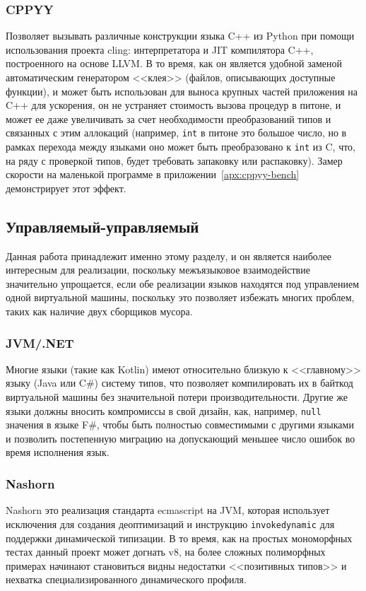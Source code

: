 \documentclass[times
,titlepage
]{itmo-student-thesis}
\begin{document}
\subsubsection{CPPYY}
Позволяет вызывать различные конструкции языка C++ из Python при помощи использования проекта cling: интерпретатора и JIT компилятора C++, построенного на основе LLVM. В то время, как он является удобной заменой автоматическим генератором <<клея>> (файлов, описывающих доступные функции), и может быть использован для выноса крупных частей приложения на C++ для ускорения, он не устраняет стоимость вызова процедур в питоне, и может ее даже увеличивать за счет необходимости преобразований типов и связанных с этим аллокаций (например, \texttt{int} в питоне это большое число, но в рамках перехода между языками оно может быть преобразовано к \texttt{int} из C, что, на ряду с проверкой типов, будет требовать запаковку или распаковку). Замер скорости на маленькой программе в приложении~\ref{apx:cppyy-bench} демонстрирует этот эффект.

\subsection{Управляемый-управляемый}
Данная работа принадлежит именно этому разделу, и он является наиболее интересным для реализации, поскольку межъязыковое взаимодействие значительно упрощается, если обе реализации языков находятся под управлением одной виртуальной машины, поскольку это позволяет избежать многих проблем, таких как наличие двух сборщиков мусора.
\subsubsection{JVM/.NET}
Многие языки (такие как Kotlin) имеют относительно близкую к <<главному>> языку (Java или C\#) систему типов, что позволяет компилировать их в байткод виртуальной машины без значительной потери производительности. Другие же языки должны вносить компромиссы в свой дизайн, как, например, \texttt{null} значения в языке F\#, чтобы быть полностью совместимыми с другими языками и позволить постепенную миграцию на допускающий меньшее число ошибок во время исполнения язык.
\subsubsection{Nashorn}
Nashorn это реализация стандарта ecmascript на JVM, которая использует исключения для создания деоптимизаций и инструкцию \texttt{invokedynamic} для поддержки динамической типизации. В то время, как на простых мономорфных тестах данный проект может догнать v8, на более сложных полиморфных примерах начинают становиться видны недостатки <<позитивных типов>> и нехватка специализированного динамического профиля.
\end{document}
